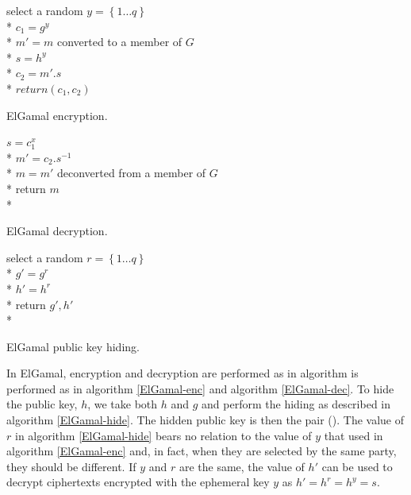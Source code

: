 \documentclass[ %
                    author={Luke Murray},
                supervisor={Dr. Simon Hollis},
                     title={Shadow Peer-to-Peer Networks},
                  subtitle={},
                    degree={MEng},
                      year={2013} ]{thesis}
\begin{document}
\begin{algorithm}[t]
    select a random $y = \left\{1 \ldots q\right\}$\\*
    $c_1 = g^{y}$\\*
    $m\prime = m$ converted to a member of $G$\\*
    $s = h^{y}$\\*
    $c_2 = m\prime.s$\\*
    $return (c_1, c_2)$
\caption{ElGamal encryption.}
\label{ElGamal-enc}
\end{algorithm}
\begin{algorithm}[t]
    $s = c_1^{x}$\\*
    $m\prime = c_2.s^{-1}$\\*
    $m = m\prime$ deconverted from a member of $G$\\*
    return $m$\\*
\caption{ElGamal decryption.}
\label{ElGamal-dec}
\end{algorithm}
\begin{algorithm}[t]
    select a random $r = \left\{1 \ldots q\right\}$\\*
    $g\prime = g^{r}$\\*
    $h\prime = h^{r}$\\*
    return $g\prime,h\prime$\\*
\caption{ElGamal public key hiding.}
\label{ElGamal-hide}
\end{algorithm}

In ElGamal, encryption and decryption are performed as in algorithm is performed as in algorithm \ref{ElGamal-enc} and algorithm \ref{ElGamal-dec}. To hide the public key, $h$, we take both $h$ and $g$ and perform the hiding as described in algorithm \ref{ElGamal-hide}. The hidden public key is then the pair (). The value of $r$ in algorithm \ref{ElGamal-hide} bears no relation to the value of $y$ that used in algorithm \ref{ElGamal-enc} and, in fact, when they are selected by the same party, they should be different. If $y$ and $r$ are the same, the value of $h\prime$ can be used to decrypt ciphertexts encrypted with the ephemeral key $y$ as $h\prime = h^{r} = h^{y} = s$.
\end{document}
